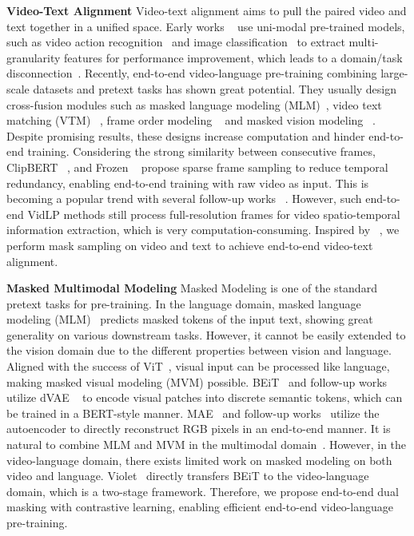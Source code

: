 \documentclass[10pt,twocolumn,letterpaper]{article}
\begin{document}
\noindent\textbf{Video-Text Alignment}
Video-text alignment aims to pull the paired video and text together in a unified space. Early works ~\cite{hero, UniVL} use uni-modal pre-trained models, such as video action recognition~\cite{slowfast, tsn, tsm, s3d} and image classification~\cite{vgg, resnet, swin} to extract multi-granularity features for performance improvement, which leads to a domain/task disconnection~\cite{clipbert}. Recently, end-to-end video-language pre-training combining large-scale datasets and pretext tasks has shown great potential. They usually design cross-fusion modules such as masked language modeling (MLM)~\cite{videobert, vl-bert}, video text matching (VTM) ~\cite{clipbert, actbert}, frame order modeling ~\cite{hero, merlot} and masked vision modeling ~\cite{hero, VIOLET}. Despite promising results, these designs increase computation and hinder end-to-end training. Considering the strong similarity between consecutive frames, ClipBERT ~\cite{clipbert}, and Frozen ~\cite{Frozen} propose sparse frame sampling to reduce temporal redundancy, enabling end-to-end training with raw video as input. This is becoming a popular trend with several follow-up works ~\cite{BridgeFormer, miles, alpro, OA-Trans}. However, such end-to-end VidLP methods still process full-resolution frames for video spatio-temporal information extraction, which is very computation-consuming. Inspired by ~\cite{mae, videomae, st_mae}, we perform mask sampling on video and text to achieve end-to-end video-text alignment.


\vspace{1mm}\noindent\textbf{Masked Multimodal Modeling}
Masked Modeling is one of the standard pretext tasks for pre-training. In the language domain, masked language modeling (MLM)~\cite{bert} predicts masked tokens of the input text, showing great generality on various downstream tasks. However, it cannot be easily extended to the vision domain due to the different properties between vision and language. Aligned with the success of ViT~\cite{vit, vivit}, visual input can be processed like language, making masked visual modeling (MVM) possible. BEiT~\cite{beit} and follow-up works~\cite{bevt, ibot, vimpac} utilize dVAE ~\cite{dvae} to encode visual patches into discrete semantic tokens, which can be trained in a BERT-style manner. MAE~\cite{mae} and follow-up works~\cite{simmim, videomae, st_mae} utilize the autoencoder to directly reconstruct RGB pixels in an end-to-end manner. It is natural to combine MLM and MVM in the multimodal domain~\cite{vl-beit, beit-3, multimae}. However, in the video-language domain, there exists limited work on masked modeling on both video and language. Violet~\cite{VIOLET} directly transfers BEiT to the video-language domain, which is a two-stage framework. Therefore, we propose end-to-end dual masking with contrastive learning, enabling efficient end-to-end video-language pre-training.
\end{document}
